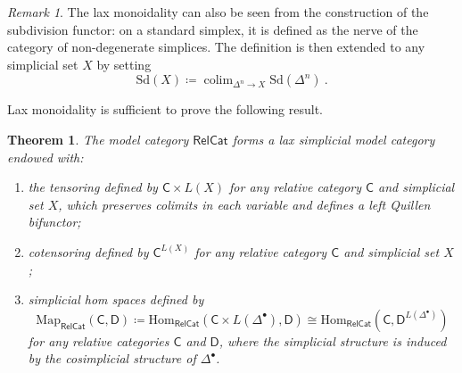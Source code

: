 \documentclass{proc-l}
\DeclareMathOperator*{\colim}{colim}
\theoremstyle{plain}
\newtheorem{theorem}{Theorem}[section]
\theoremstyle{definition}
\theoremstyle{remark}
\newtheorem{remark}[{theorem}]{Remark}
\begin{document}
\begin{remark}%
\label{Remark:A.9}The lax monoidality can also be seen from the construction of the subdivision functor: on a standard simplex, it is defined as the nerve of the category of non-degenerate simplices. The definition is then extended to any simplicial set $X$ by setting
\[
\mathrm{Sd}(X) \coloneqq \colim_{\Delta^n \rightarrow X}\mathrm{Sd}(\Delta^n)~.
\]
\end{remark}

Lax monoidality is sufficient to prove the following result.

\begin{theorem}%
\label{Theorem:A.10}\label{thm: lax simplicial tensoring and cotensoring}
The model category $\mathsf{RelCat}$ forms a lax simplicial model category endowed with:

\begin{enumerate}[label=(\arabic*),start=1]
\item the tensoring defined by $\mathsf{C} \times L(X)$ for any relative category $\mathsf{C}$ and simplicial set $X$, which preserves colimits in each variable and defines a left Quillen bifunctor;

\item cotensoring defined by $\mathsf{C}^{L(X)}$ for any relative category $\mathsf{C}$ and simplicial set $X$;

\item simplicial hom spaces defined by
\[
\mathrm{Map}_{\mathsf{RelCat}}(\mathsf{C},\mathsf{D}) \coloneqq \mathrm{Hom}_{\mathsf{RelCat}}(\mathsf{C}\times L(\Delta^{\bullet}),\mathsf{D})\cong \mathrm{Hom}_{\mathsf{RelCat}}(\mathsf{C},\mathsf{D}^{L(\Delta^{\bullet})})
\]
for any relative categories $\mathsf{C}$ and $\mathsf{D}$, where the simplicial structure is induced by the cosimplicial structure of $\Delta^{\bullet}$.
\end{enumerate}
\end{theorem}
\end{document}
